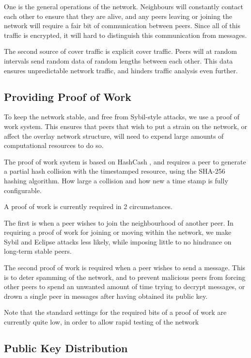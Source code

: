 One is the general operations of the network. Neighbours will constantly contact each other to ensure that they are alive, and any peers leaving or joining the network will require a fair bit of communication between peers. Since all of this traffic is encrypted, it will hard to distinguish this communication from messages.

The second source of cover traffic is explicit cover traffic. Peers will at random intervals send random data of random lengths between each other. This data ensures unpredictable network traffic, and hinders traffic analysis even further.

\subsection{Providing Proof of Work}

To keep the network stable, and free from Sybil-style attacks, we use a proof of work system. This ensures that peers that wish to put a strain on the network, or affect the overlay network structure, will need to expend large amounts of computational resources to do so.

The proof of work system is based on HashCash \citep{HashCash}, and requires a peer to generate a partial hash collision with the timestamped resource, using the SHA-256 hashing algorithm. How large a collision and how new a time stamp is fully configurable.

A proof of work is currently required in 2 circumstances.

The first is when a peer wishes to join the neighbourhood of another peer. In requiring a proof of work for joining or moving within the network, we make Sybil and Eclipse attacks less likely, while imposing little to no hindrance on long-term stable peers.

The second proof of work is required when a peer wishes to send a message. This is to deter spamming of the network, and to prevent malicious peers from forcing other peers to spend an unwanted amount of time trying to decrypt messages, or drown a single peer in messages after having obtained its public key.

Note that the standard settings for the required bits of a proof of work are currently quite low, in order to allow rapid testing of the network

\subsection{Public Key Distribution}

